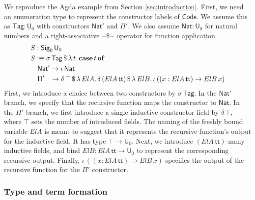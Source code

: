 \documentclass[acmsmall,screen,review,anonymous]{acmart}
\newcommand{\msf}[1]{{\mathsf{#1}}}
\newcommand{\mbf}[1]{{\mathbf{#1}}}
\newcommand{\U}{\msf{U}}
\newcommand{\Nat}{\msf{Nat}}
\newcommand{\Sig}{\msf{Sig}}
\newcommand{\Code}{\msf{Code}}
\newcommand{\Tag}{\msf{Tag}}
\newcommand{\case}{\mbf{case}}
\newcommand{\of}{\mbf{of}}
\newcommand{\ttt}{\msf{tt}}
\newcommand{\blank}{{\mathord{\hspace{1pt}\text{--}\hspace{1pt}}}}
\begin{document}
\begin{example}\label{ex:code-signature}
We reproduce the Agda example from Section \ref{sec:introduction}. First, we need an enumeration
type to represent the constructor labels of $\Code$. We assume this as $\Tag : \U_0$ with
constructors $\Nat'$ and $\Pi'$. We also assume $\Nat : \U_0$ for natural numbers and a
right-associative $\blank\!\$\!\blank$ operator for function application.
\begin{alignat*}{4}
  & S : \Sig_0\,\U_0\\
  & S :\equiv \sigma\,\Tag\,\$\,\lambda\,t.\,\case\,t\,\of \\
  & \quad \Nat' \to \iota\,\Nat \\
  & \quad \Pi'\hspace{0.85em} \to \delta\,\top\,\$\,\lambda\,{ElA}.\, \delta\,({ElA}\,\ttt)\,\$\,\lambda\,{ElB}.\,
      \iota\, ((x : {ElA}\,\ttt) \to {ElB}\,x)
\end{alignat*}
First, we introduce a choice between two constructors by $\sigma\,\Tag$. In the $\Nat'$ branch, we
specify that the recursive function maps the constructor to $\Nat$. In the $\Pi'$ branch, we first
introduce a single inductive constructor field by $\delta\,\top$, where $\top$ sets the number of
introduced fields. The naming of the freshly bound variable ${ElA}$ is meant to suggest that it
represents the recursive function's output for the inductive field. It has type $\top \to \U_0$.
Next, we introduce $({ElA}\,\ttt)$-many inductive fields, and bind ${ElB} : {ElA}\,\ttt \to \U_0$ to
represent the corresponding recursive output. Finally, $\iota\, ((x : {ElA}\,\ttt) \to {ElB}\,x)$
specifies the output of the recursive function for the $\Pi'$ constructor.
\end{example}

\subsubsection{Type and term formation}\label{sec:ir-type-and-term-formation}
\end{document}
